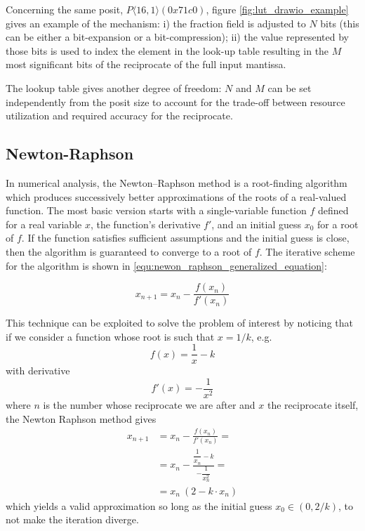 Concerning the same posit, $P\langle 16,1 \rangle(0x71c0)$, figure \ref{fig:lut_drawio_example} gives an example of the mechanism: i) the fraction field is adjusted to $N$ bits (this can be either a bit-expansion or a bit-compression); ii) the value represented by those bits is used to index the element in the look-up table resulting in the $M$ most significant bits of the reciprocate of the full input mantissa.

The lookup table gives another degree of freedom: $N$ and $M$ can be set independently from the posit size to account for the trade-off between resource utilization and required accuracy for the reciprocate.


\subsection{Newton-Raphson}\label{Newton_Raphson}


In numerical analysis, the Newton–Raphson method \cite{Hale2015_a} is a root-finding algorithm which produces successively better approximations of the roots of a real-valued function. The most basic version starts with a single-variable function $f$ defined for a real variable $x$, the function's derivative $f'$, and an initial guess $x_0$ for a root of $f$.
If the function satisfies sufficient assumptions and the initial guess is close, then the algorithm is guaranteed to converge to a root of $f$. The iterative scheme for the algorithm is shown in \eqref{equ:newon_raphson_generalized_equation}:

\begin{equation}\label{equ:newon_raphson_generalized_equation}
x_{n+1} = x_n - \frac{f(x_n)}{f'(x_n)}
\end{equation}

This technique can be exploited to solve the problem of interest by noticing that if we consider a function whose root is such that $x = 1/k$, e.g.
\begin{equation}
f(x) = \frac{1}{x} - k
\end{equation}
with derivative
$$
f'(x) = -\frac{1}{x^2}
$$
where $n$ is the number whose reciprocate we are after and $x$ the reciprocate itself, the Newton Raphson method gives
\begin{equation}
\begin{aligned}
x_{n+1} &= x_n - \frac{f(x_n)}{f'(x_n)} = \\
& = x_n - \frac{\dfrac{1}{x_n} - k}{-\dfrac{1}{x_n^2}} = \\
& = x_n\ (2 - k \cdot x_n)
\end{aligned}
\end{equation}
which yields a valid approximation so long as the initial guess $x_0 \in (0, 2/k)$, to not make the iteration diverge.



